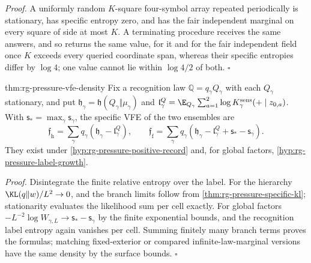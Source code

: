 \noindent\emph{Proof.}
A uniformly random $K$-square four-symbol array repeated periodically is
stationary, has specific entropy zero, and has the fair independent marginal
on every square of side at most $K$. A terminating procedure receives the same
answers, and so returns the same value, for it and for the fair independent
field once $K$ exceeds every queried coordinate span, whereas their specific
entropies differ by $\log4$; one value cannot lie within $\log4/2$ of both.
$\square$

{thm:rg-pressure-vfe-density}
Fix a recognition law $\mathbb Q=q_\gamma Q_\gamma$ with each $Q_\gamma$
stationary, and put $\mathfrak h_\gamma=\mathfrak h(Q_\gamma\Vert\mu_\gamma)$
and $\mathfrak l^Q_\gamma=\E_{Q_\gamma}\sum_{a=1}^2
\log K^{\mathrm{sens}}_\gamma(+\mid z_{0,a})$. With
$\mathsf s_*=\max_\gamma\mathsf s_\gamma$, the specific VFE of the two
ensembles are
\begin{equation}
 \mathfrak f_{\mathrm h}=\sum_\gamma q_\gamma(\mathfrak h_\gamma-\mathfrak l_\gamma^Q),\qquad
 \mathfrak f_{\mathrm f}=\sum_\gamma q_\gamma
       (\mathfrak h_\gamma-\mathfrak l_\gamma^Q+\mathsf s_*-\mathsf s_\gamma).
 \label{eq:rg-pressure-vfe-density}
\end{equation}
They exist under \cref{hyp:rg-pressure-positive-record} and, for global
factors, \cref{hyp:rg-pressure-label-growth}. 

\noindent\emph{Proof.}
Disintegrate the finite relative entropy over the label. For the hierarchy
$\KL(q\Vert w)/L^2\to0$, and the branch limits follow from
\cref{thm:rg-pressure-specific-kl}; stationarity evaluates the likelihood sum
per cell exactly. For global factors
$-L^{-2}\log W_{\gamma,L}\to\mathsf s_*-\mathsf s_\gamma$ by the finite
exponential bounds, and the recognition label entropy again vanishes per cell.
Summing finitely many branch terms proves the formulas; matching
fixed-exterior or compared infinite-law-marginal versions have the same
density by the surface bounds. $\square$

